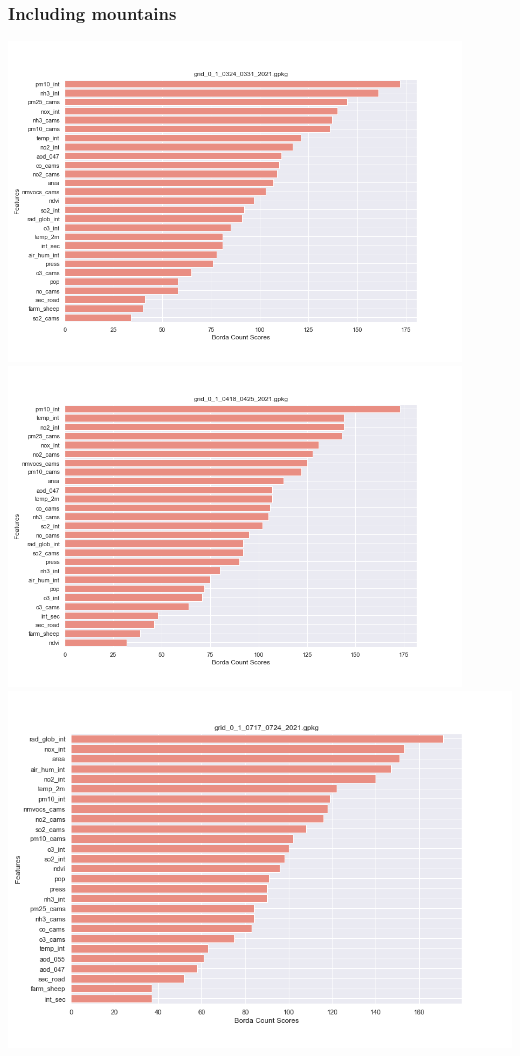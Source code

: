 \subsubsection{Including mountains}
\begin{center}
\includegraphics[width=0.9\textwidth]{images/fs_results/pm25/01/montains/grid_0_1_0324_0331_2021.png}
\includegraphics[width=0.9\textwidth]{images/fs_results/pm25/01/montains/grid_0_1_0418_0425_2021.png}
\includegraphics[width=.9\textwidth]{images/fs_results/pm25/01/montains/grid_0_1_0717_0724_2021.png}

\end{center}
